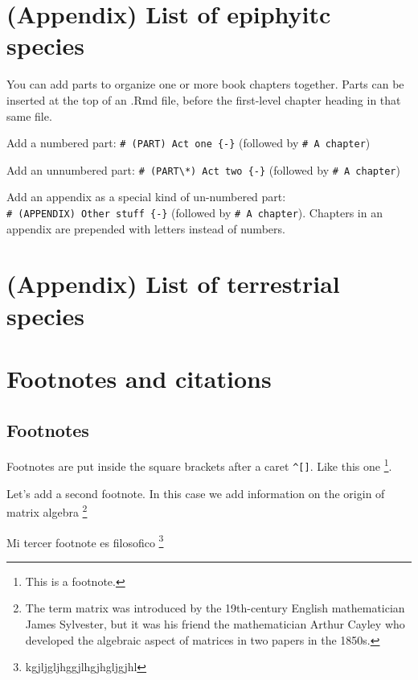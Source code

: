 \documentclass[
]{book}
\theoremstyle{definition}
\theoremstyle{definition}
\theoremstyle{definition}
\theoremstyle{definition}
\theoremstyle{remark}
\begin{document}
\chapter*{(Appendix) List of epiphyitc species}\label{appendix-list-of-epiphyitc-species}

You can add parts to organize one or more book chapters together. Parts can be inserted at the top of an .Rmd file, before the first-level chapter heading in that same file.

Add a numbered part: \texttt{\#\ (PART)\ Act\ one\ \{-\}} (followed by \texttt{\#\ A\ chapter})

Add an unnumbered part: \texttt{\#\ (PART\textbackslash{}*)\ Act\ two\ \{-\}} (followed by \texttt{\#\ A\ chapter})

Add an appendix as a special kind of un-numbered part: \texttt{\#\ (APPENDIX)\ Other\ stuff\ \{-\}} (followed by \texttt{\#\ A\ chapter}). Chapters in an appendix are prepended with letters instead of numbers.

\chapter*{(Appendix) List of terrestrial species}\label{appendix-list-of-terrestrial-species}

\chapter{Footnotes and citations}\label{footnotes-and-citations}

\section{Footnotes}\label{footnotes}

Footnotes are put inside the square brackets after a caret \texttt{\^{}{[}{]}}. Like this one \footnote{This is a footnote.}.

Let's add a second footnote. In this case we add information on the origin of matrix algebra \footnote{The term matrix was introduced by the 19th-century English mathematician James Sylvester, but it was his friend the mathematician Arthur Cayley who developed the algebraic aspect of matrices in two papers in the 1850s.}

Mi tercer footnote es filosofico \footnote{kgjljgljhggjlhgjhgljgjhl}
\end{document}
